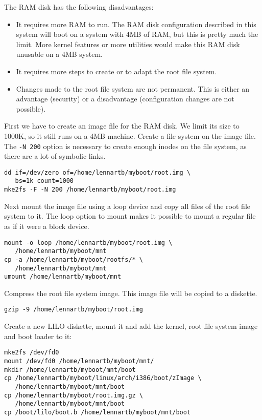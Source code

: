\documentclass[12pt,a4paper]{article}
\begin{document}
The RAM disk has the following disadvantages:
\begin{itemize}
\item It requires more RAM to run. The RAM disk configuration
  described in this system will boot on a system with 4MB of RAM, but
  this is pretty much the limit. More kernel features or more
  utilities would make this RAM disk unusable on a 4MB system.
\item It requires more steps to create or to adapt the root file system.
\item Changes made to the root file system are not permanent. This is
  either an advantage (security) or a disadvantage (configuration
  changes are not possible). 
\end{itemize}

First we have to create an image file for the RAM disk. We limit its
size to 1000K, so it still runs on a 4MB machine. Create a file system
on the image file. The {\tt -N 200} option is necessary to create
enough inodes on the file system, as there are a lot of symbolic links.
\begin{verbatim}
dd if=/dev/zero of=/home/lennartb/myboot/root.img \
   bs=1k count=1000
mke2fs -F -N 200 /home/lennartb/myboot/root.img
\end{verbatim}

Next mount the image file using a loop device and copy all files of
the root file system to it. The loop option to mount makes it possible
to mount a regular file as if it were a block device.
\begin{verbatim}
mount -o loop /home/lennartb/myboot/root.img \
   /home/lennartb/myboot/mnt
cp -a /home/lennartb/myboot/rootfs/* \
   /home/lennartb/myboot/mnt
umount /home/lennartb/myboot/mnt
\end{verbatim}

Compress the root file system image. This image file will be copied to
a diskette.
\begin{verbatim}
gzip -9 /home/lennartb/myboot/root.img
\end{verbatim}

Create a new LILO diskette, mount it and add the kernel, root file
system image and boot loader to it:
\begin{verbatim}
mke2fs /dev/fd0
mount /dev/fd0 /home/lennartb/myboot/mnt/
mkdir /home/lennartb/myboot/mnt/boot
cp /home/lennartb/myboot/linux/arch/i386/boot/zImage \
   /home/lennartb/myboot/mnt/boot
cp /home/lennartb/myboot/root.img.gz \
   /home/lennartb/myboot/mnt/boot
cp /boot/lilo/boot.b /home/lennartb/myboot/mnt/boot
\end{verbatim}
\end{document}
